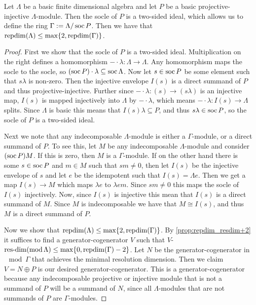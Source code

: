\begin{theorem}\label{thm:mod_out_socle}
	Let $\Lambda$ be a basic finite dimensional algebra and let $P$ be a basic projective-injective $\Lambda$-module. Then the socle of $P$ is a two-sided ideal, which allows us to define the ring $\Gamma := \Lambda / \operatorname{soc} P$. Then we have that $\operatorname{repdim}(\Lambda) \leq \max\{2, \operatorname{repdim}(\Gamma)\}$. 
	\begin{proof}
		First we show that the socle of $P$ is a two-sided ideal. Multiplication on the right defines a homomorphism $-\cdot \lambda\colon \Lambda \to \Lambda$. Any homomorphism maps the socle to the socle, so $(\operatorname{soc} P) \cdot \lambda \subseteq \operatorname{soc} \Lambda$. Now let $s \in \operatorname{soc} P$ be some element such that $s\lambda$ is non-zero. Then the injective envelope $I(s)$ is a direct summand of $P$ and thus projective-injective. Further since $-\cdot \lambda\colon (s) \to (s\lambda)$ is an injective map, $I(s)$ is mapped injectively into $\Lambda$ by $-\cdot \lambda$, which means $-\cdot\lambda\colon I(s) \to \Lambda$ splits. Since $\Lambda$ is basic this means that $I(s)\lambda \subseteq P$, and thus $s\lambda \in \operatorname{soc} P$, so the socle of $P$ is a two-sided ideal.
		
		Next we note that any indecomposable $\Lambda$-module is either a $\Gamma$-module, or a direct summand of $P$. To see this, let $M$ be any indecomposable $\Lambda$-module and consider $(\operatorname{soc} P)M$. If this is zero, then $M$ is a $\Gamma$-module. If on the other hand there is some $s \in \operatorname{soc} P$ and $m \in M$ such that $sm \neq 0$, then let $I(s)$ be the injective envelope of $s$ and let $e$ be the idempotent such that $I(s) = \Lambda e$. Then we get a map $I(s) \to M$ which maps $\lambda e$ to $\lambda e m$. Since $sm \neq 0$ this maps the socle of $I(s)$ injectively. Now, since $I(s)$ is injective this mean that $I(s)$ is a direct summand of $M$. Since $M$ is indecomposable we have that $M \cong I(s)$, and thus $M$ is a direct summand of $P$.
		
		Now we show that $\operatorname{repdim}(\Lambda) \leq \max\{2, \operatorname{repdim}(\Gamma)\}$. By \cref{prop:repdim_resdim+2} it suffices to find a generator-cogenerator $V$ such that $V$-$\operatorname{res-dim}(\operatorname{mod} \Lambda) \leq \max\{0, \operatorname{repdim}(\Gamma)-2\}$. Let $N$ be the generator-cogenerator in $\mod\Gamma$ that achieves the minimal resolution dimension. Then we claim $V = N \oplus P$ is our desired generator-cogenerator. This is a generator-cogenerator because any indecomposable projective or injective module that is not a summand of $P$ will be  a summand of $N$, since all $\Lambda$-modules that are not summands of $P$ are $\Gamma$-modules.
		

\end{proof}
\end{theorem}
